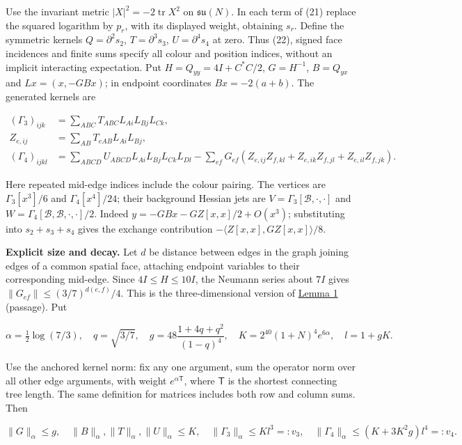 \documentclass[11pt,a4paper]{article}
\begin{document}
Use the invariant metric \(|X|^2=-2\operatorname{tr}X^2\) on
\(\mathfrak{su}(N)\). In each term of (21) replace the squared logarithm
by \(p_r\), with its displayed weight, obtaining \(s_r\). Define the
symmetric kernels \(Q=\partial^2s_2\), \(T=\partial^3s_3\),
\(U=\partial^4s_4\) at zero. Thus (22), signed face incidences and
finite sums specify all colour and position indices, without an implicit
interacting expectation. Put \(H=Q_{yy}=4I+C^*C/2\), \(G=H^{-1}\),
\(B=Q_{yx}\) and \(Lx=(x,-GBx)\); in endpoint coordinates
\(Bx=-2(a+b)\). The generated kernels are

\[\begin{aligned}
 (\Gamma_3)_{ijk}&=\sum_{ABC}T_{ABC}L_{Ai}L_{Bj}L_{Ck},\\
 Z_{e,ij}&=\sum_{AB}T_{eAB}L_{Ai}L_{Bj},\\
 (\Gamma_4)_{ijkl}&=\sum_{ABCD}U_{ABCD}L_{Ai}L_{Bj}L_{Ck}L_{Dl}
 -\sum_{ef}G_{ef}(Z_{e,ij}Z_{f,kl}+Z_{e,ik}Z_{f,jl}+Z_{e,il}Z_{f,jk}).
\end{aligned}\tag{23}\]

Here repeated mid-edge indices include the colour pairing. The vertices
are \(\Gamma_3[x^3]/6\) and \(\Gamma_4[x^4]/24\); their background
Hessian jets are \(V=\Gamma_3[\mathcal B,\cdot,\cdot]\) and
\(W=\Gamma_4[\mathcal B,\mathcal B,\cdot,\cdot]/2\). Indeed
\(y=-GBx-GZ[x,x]/2+O(x^3)\); substituting into \(s_2+s_3+s_4\) gives the
exchange contribution \(-\langle Z[x,x],GZ[x,x]\rangle/8\).

\textbf{Explicit size and decay.} Let \(d\) be distance between edges in
the graph joining edges of a common spatial face, attaching endpoint
variables to their corresponding mid-edge. Since \(4I\le H\le10I\), the
Neumann series about \(7I\) gives \(\|G_{ef}\|\le(3/7)^{d(e,f)}/4\).
This is the three-dimensional version of
\href{su2-midplane-small-field.md}{Lemma 1} (passage). Put

\[\alpha=\tfrac12\log(7/3),\quad q=\sqrt{3/7},\quad
 g=48\frac{1+4q+q^2}{(1-q)^4},\quad
 K=2^{40}(1+N)^4e^{6\alpha},\quad l=1+gK. \tag{24}\]

Use the anchored kernel norm: fix any one argument, sum the operator
norm over all other edge arguments, with weight \(e^{\alpha\mathsf T}\),
where \(\mathsf T\) is the shortest connecting tree length. The same
definition for matrices includes both row and column sums. Then

\[\|G\|_\alpha\le g,\quad \|B\|_\alpha,\|T\|_\alpha,\|U\|_\alpha\le K,
 \quad \|\Gamma_3\|_\alpha\le Kl^3=:v_3,\quad
 \|\Gamma_4\|_\alpha\le(K+3K^2g)l^4=:v_4. \tag{25}\]
\end{document}
